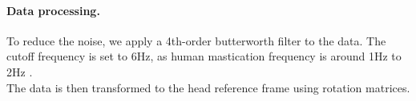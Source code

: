 \paragraph{Data processing.}
To reduce the noise, we apply a 4th-order butterworth filter to the data. The cutoff frequency is set to 6Hz, as human mastication frequency is around 1Hz to 2Hz %
. \\
The data is then transformed to the head reference frame using rotation matrices. 







